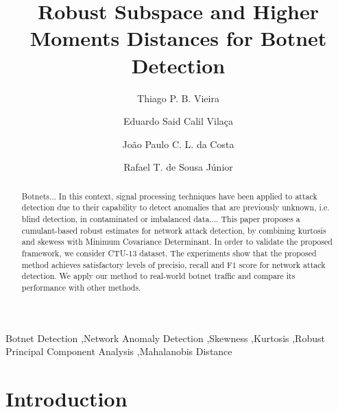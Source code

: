 \documentclass[review]{elsarticle}
\begin{document}
\begin{frontmatter}

\title{Robust Subspace and Higher Moments Distances for Botnet Detection}

\author[unbaddress]{Thiago P. B. Vieira}
\author[unbaddress]{Eduardo Said Calil Vilaça}
\author[unbaddress,Ilmenauaddress,Fraunhoferaddress]{João Paulo C. L. da Costa}
\author[unbaddress]{Rafael T. de Sousa Júnior}

\address[unbaddress]{Department of Electrical Engineering, University of Brasilia (UnB), 70910-900, Brasília-DF, Brazil}
\address[Ilmenauaddress]{Institute for Information Technology, Ilmenau University of Technology, Ilmenau, Germany}
\address[Fraunhoferaddress]{Fraunhofer Institute for Integrated Circuits IIS, Erlangen, Germany}


\begin{abstract}
Botnets... In this context, signal processing techniques have been applied to attack detection due to their capability to detect anomalies that are previously unknown, i.e. blind detection, in contaminated or imbalanced data.... This paper proposes a cumulant-based robust estimates for network attack detection, by combining kurtosis and skewess with Minimum Covariance Determinant. In order to validate the proposed framework, we consider CTU-13 dataset. The experiments show that the proposed method achieves satisfactory levels of precisio, recall and F1 score for network attack detection. We apply our method to real-world botnet traffic and compare its performance with other methods.
\end{abstract}

\begin{keyword}
Botnet Detection \sep Network Anomaly Detection \sep Skewness \sep Kurtosis \sep Robust Principal Component Analysis \sep Mahalanobis Distance
\end{keyword}

\end{frontmatter}

\linenumbers

\section{Introduction}
\label{sec:introduction}
\end{document}

